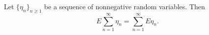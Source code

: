 Let $\{\eta_n\}_{n \geq 1}$ be a sequence of nonnegative random variables. Then
$$E \sum_{n=1}^{\infty} \eta_n = \sum_{n=1}^{\infty} E \eta_n.$$
